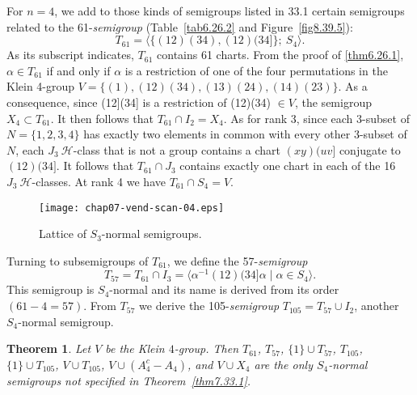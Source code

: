 \documentclass{surv-l}
\numberwithin{equation}{section}
\numberwithin{table}{section}
\numberwithin{figure}{section}
\theoremstyle{plain}
\newtheorem{theorem}[equation]{Theorem}
\theoremstyle{definition}
\begin{document}
For $n =4$, we add to those kinds of semigroups listed in 33.1
certain semigroups related to the 61-\emph{semigroup}
(Table~\ref{tab6.26.2} and Figure~\ref{fig8.39.5}):
\[
T_{61}=\langle\{(12)(34), (12)(34]\};\ S_{4}\rangle.
\]
As its subscript indicates, $T_{61}$ contains 61 charts. From the
proof of \ref{thm6.26.1}, $\alpha\in T_{61}$ if and only if
$\alpha$ is a restriction of one of the four permutations in the
Klein 4-group $V=\{(1),(12) (34),(13)(24),(14)(23)\}$. As a
consequence, since (12](34] is a restriction of (12)(34) $\in V$,
the semigroup $X_{4}\subset T_{61}$. It then follows that
$T_{61}\cap I_{2}=X_{4}$. As for rank 3, since each 3-subset of
$N=\{1,2,3,4\}$ has exactly two elements in common with every
other 3-subset of $N$, each $J_{3}\ \mathcal{H}$-class that is not a
group contains a chart $(xy)(uv]$ conjugate to $(12)(34]$. It
follows that $T_{61}\cap J_{3}$ contains exactly one chart in each
of the 16 $J_{3}\ \mathcal{H}$-classes. At rank 4 we have
$T_{61}\cap S_{4}= V$.

\begin{figure}[!h]
\texttt{[image: chap07-vend-scan-04.eps]}
\caption{Lattice of $S_{3}$-normal semigroups.}\label{fig7.34.1}
\end{figure}

Turning to subsemigroups of $T_{61}$, we
define the 57-\emph{semigroup}
\[
 T_{57}=T_{61}\cap I_{3}=\langle\alpha^{-1}(12)(34]\alpha\mid \alpha\in S_{4}\rangle.
\]
This semigroup is $S_{4}$-normal and its name is derived from its
order $(61-4= 57)$. From $T_{57}$ we derive the
105-\emph{semigroup} $T_{105}=T_{57}\cup
I_{2}$, another $S_{4}$-normal
semigroup.

\setcounter{equation}{1}
\begin{theorem}\label{thm7.34.2}
Let $V$ be the Klein $4$-group. Then $T_{61}$, $T_{57}$, $\{1\}\cup
T_{57}$, $T_{105}$, $\{1\}\cup T_{105}$, $V\cup T_{105}$, $V\cup
(A_{4}^{c}-A_{4})$, and $V\cup X_{4}$ are the only $S_{4}$-normal
semigroups not specified in \emph{Theorem~\ref{thm7.33.1}}.
\end{theorem}
\end{document}
